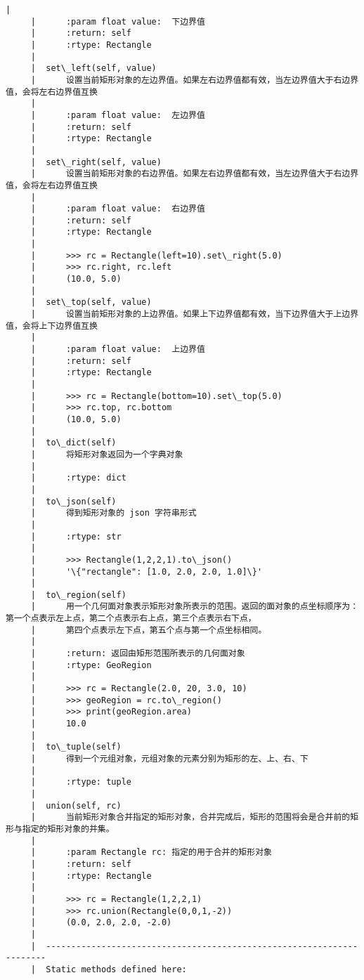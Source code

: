 \documentclass[11pt]{article}
\begin{document}
\begin{Verbatim}[commandchars=\\\{\}]
     |      
     |      :param float value:  下边界值
     |      :return: self
     |      :rtype: Rectangle
     |  
     |  set\_left(self, value)
     |      设置当前矩形对象的左边界值。如果左右边界值都有效，当左边界值大于右边界值，会将左右边界值互换
     |      
     |      :param float value:  左边界值
     |      :return: self
     |      :rtype: Rectangle
     |  
     |  set\_right(self, value)
     |      设置当前矩形对象的右边界值。如果左右边界值都有效，当左边界值大于右边界值，会将左右边界值互换
     |      
     |      :param float value:  右边界值
     |      :return: self
     |      :rtype: Rectangle
     |      
     |      >>> rc = Rectangle(left=10).set\_right(5.0)
     |      >>> rc.right, rc.left
     |      (10.0, 5.0)
     |  
     |  set\_top(self, value)
     |      设置当前矩形对象的上边界值。如果上下边界值都有效，当下边界值大于上边界值，会将上下边界值互换
     |      
     |      :param float value:  上边界值
     |      :return: self
     |      :rtype: Rectangle
     |      
     |      >>> rc = Rectangle(bottom=10).set\_top(5.0)
     |      >>> rc.top, rc.bottom
     |      (10.0, 5.0)
     |  
     |  to\_dict(self)
     |      将矩形对象返回为一个字典对象
     |      
     |      :rtype: dict
     |  
     |  to\_json(self)
     |      得到矩形对象的 json 字符串形式
     |      
     |      :rtype: str
     |      
     |      >>> Rectangle(1,2,2,1).to\_json()
     |      '\{"rectangle": [1.0, 2.0, 2.0, 1.0]\}'
     |  
     |  to\_region(self)
     |      用一个几何面对象表示矩形对象所表示的范围。返回的面对象的点坐标顺序为：第一个点表示左上点，第二个点表示右上点，第三个点表示右下点，
     |      第四个点表示左下点，第五个点与第一个点坐标相同。
     |      
     |      :return: 返回由矩形范围所表示的几何面对象
     |      :rtype: GeoRegion
     |      
     |      >>> rc = Rectangle(2.0, 20, 3.0, 10)
     |      >>> geoRegion = rc.to\_region()
     |      >>> print(geoRegion.area)
     |      10.0
     |  
     |  to\_tuple(self)
     |      得到一个元组对象，元组对象的元素分别为矩形的左、上、右、下
     |      
     |      :rtype: tuple
     |  
     |  union(self, rc)
     |      当前矩形对象合并指定的矩形对象，合并完成后，矩形的范围将会是合并前的矩形与指定的矩形对象的并集。
     |      
     |      :param Rectangle rc: 指定的用于合并的矩形对象
     |      :return: self
     |      :rtype: Rectangle
     |      
     |      >>> rc = Rectangle(1,2,2,1)
     |      >>> rc.union(Rectangle(0,0,1,-2))
     |      (0.0, 2.0, 2.0, -2.0)
     |  
     |  ----------------------------------------------------------------------
     |  Static methods defined here:

\end{Verbatim}
\end{document}

